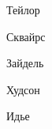 \documentclass[oneside]{book}
\begin{document}








%

%

\begin{thebibliography}{1}
    
Тейлор

Сквайрс

Зайдель

Худсон

Идье

\end{thebibliography}
\end{document}
